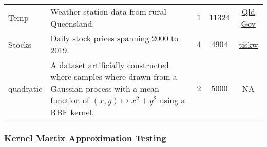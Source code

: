 \begin{longtable}{lp{}ccc}
    Temp                                                                     & Weather station data from rural Queensland.                                                                                                                                          & $1$     & $11324$                                                                   & \href{https://www.longpaddock.qld.gov.au/}{Qld Gov}                                                                           \\
    Stocks                                                                   & Daily stock prices spanning 2000 to 2019.                                                                                                                                            & $4$     & $4904$                                                                    & \href{https://github.com/tiskw/random-fourier-features/blob/main/dataset/stockprice/download_stockprice_zipped_csv.py}{tiskw}
    \\
    quadratic                                                                & A dataset artificially constructed where samples where drawn from a Gaussian process with a mean function of $(x,y) \mapsto x^2 + y^2$ using a RBF kernel.                           & $2$     & $5000$                                                                    & NA
    \\\bottomrule
    \hline
\end{longtable}

\subsubsection{Kernel Martix Approximation Testing}\label{Section5.2.1}

